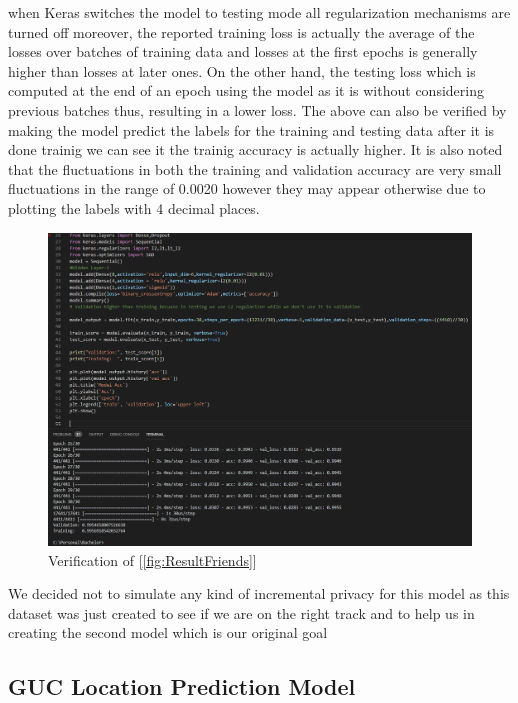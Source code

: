 when Keras switches the model to testing mode all regularization mechanisms are turned off moreover, the reported training loss is actually the average of the losses over batches of training data and losses at the first epochs is generally higher than losses at later ones. On the other hand, the testing loss which is computed at the end of an epoch using the model as it is without considering previous batches thus, resulting in a lower loss.
The above can also be verified by making the model predict the labels for the training and testing data after it is done trainig we can see it the trainig accuracy is actually higher.
It is also noted that the fluctuations in both the training and validation accuracy are very small fluctuations in the range of 0.0020 however they may appear otherwise due to plotting the labels with 4 decimal places. 
\begin{figure}[H]
    \centering
    \includegraphics[scale=0.55]{Verification}
    \caption{Verification of [\ref{fig:ResultFriends}]}
    \label{fig:Verification}
\end{figure}

We decided not to simulate any kind of incremental privacy for this model as this dataset was just created to see if we are on the right track and to help us in creating the second model which is our original goal

\subsection{GUC Location Prediction Model}
